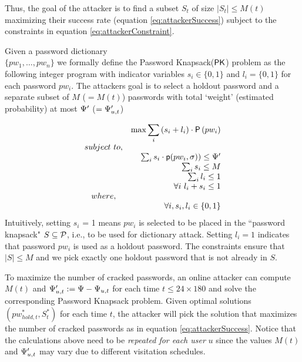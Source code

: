 Thus, the goal of the attacker is to find a subset $S_t$ of size $|S_t| \leq M(t)$ maximizing their success rate (equation \ref{eq:attackerSuccess}) subject to the constraints in  equation \ref{eq:attackerConstraint}.


  Given a password dictionary \\$\{pw_1, \ldots, pw_n\}$ we formally define the \textsf{P}assword \textsf{K}napsack($\mathsf{PK}$) problem as the following integer program with indicator variables $s_i \in \{0,1\}$ and $l_i=\{0,1\}$ for each password $pw_i$. The attackers goal is to select a holdout password and a separate subset of $M$ ($=M(t)$) passwords with total `weight' (estimated probability) at most $\Psi'$ ($= \Psi_{u,t}'$) 



$$
\begin{array}{crl}
&\max {\displaystyle{\sum_i {(s_i + l_i) \cdot \ensuremath{\mathsf{P}\left(pw_{i}\right)}}}} \\
subject\ to, &\\
&\sum_i{s_i \cdot \textsf{p}(pw_i,\sigma)) \le \Psi'} \\
&\sum_i s_i \le M\\
&\sum_i l_i \le 1\\
&\forall i~ l_i + s_i \le 1\\
where,\\
& \forall i, s_i, l_i \in \{0,1\}
\end{array}
$$
Intuitively, setting $s_i$ = 1 means $pw_i$ is selected to be placed in the ``password knapsack" $S\subseteq \mathcal{P}$, i.e., to be used for dictionary attack. Setting $l_i=1$ indicates that password $pw_i$ is used as a holdout password. The constraints ensure that $|S| \leq M$ and we pick exactly one holdout password that is not already in $S$. 


 To maximize the number of cracked passwords, an online attacker can compute $M(t)$ and $\Psi_{u,t}':=\Psi- \Psi_{u,t}$ for each time $t \leq 24 \times 180$ and solve the corresponding \textsf{P}assword \textsf{K}napsack problem. Given optimal solutions $(pw_{hold,t}^*, S_t^*)$ for each time $t$, the attacker will pick the solution that maximizes the number of cracked passwords as in equation \ref{eq:attackerSuccess}. Notice that the calculations above need to be \textit{repeated for each user} $u$ since the values $M(t)$ and $\Psi_{u,t}'$ may vary due to different visitation schedules.

